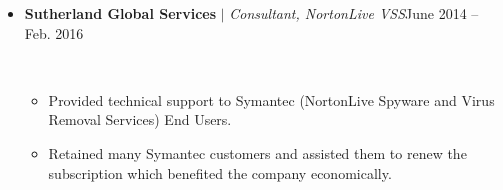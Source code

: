 \documentclass[letterpaper, 12pt]{article}
\begin{document}
\begin{itemize}
\begin{itemize}
			\end{itemize}
			\item {\begin{Large}
					\textbf{Sutherland Global Services} $|$ \textit{Consultant, NortonLive VSS}\hfill{June 2014 -- Feb. 2016}\end{Large}}\\
			\vspace*{-0.55cm}
			\begin{itemize}
				\item {Provided technical support to Symantec (NortonLive Spyware and Virus Removal Services) End Users.}
				\item {Retained many Symantec customers and assisted them to renew the subscription which benefited the company economically.}
				
			\end{itemize}
	\end{itemize}  







	
\end{document}
